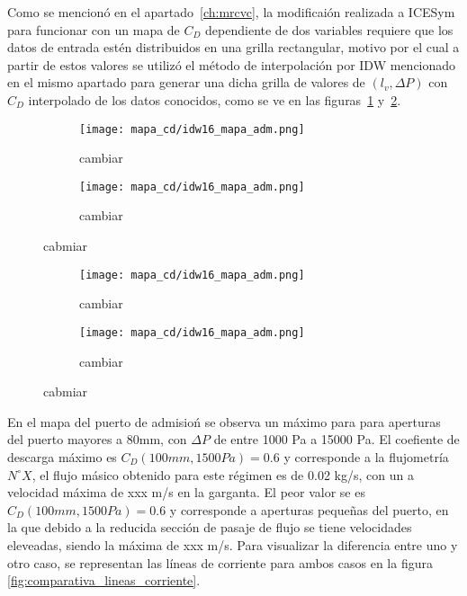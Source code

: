 Como se mencionó en el apartado~\ref{ch:mrcvc}, la modificaión realizada a
ICESym para funcionar con un mapa de $C_{D}$ dependiente de dos variables
requiere que los datos de entrada estén distribuidos en una grilla rectangular,
motivo por el cual a partir de estos valores se utilizó el método de
interpolación por IDW mencionado en el mismo apartado para generar una dicha
grilla de valores de $(l_{v}, \Delta P)$ con $C_{D}$ interpolado de los datos
conocidos, como se ve en las figuras~\ref{fig:mapa_cd_admision}
y~\ref{fig:mapa_cd_escape}.

\begin{figure}
    \centering
    \begin{subfigure}{0.4\textwidth}
        \centering
        \texttt{[image: mapa\_cd/idw16\_mapa\_adm.png]}
        \caption{cambiar}
    \end{subfigure}
    \hfill
    \begin{subfigure}{0.4\textwidth}
        \centering
        \texttt{[image: mapa\_cd/idw16\_mapa\_adm.png]}
        \caption{cambiar}
    \end{subfigure}
    \caption{cabmiar}\label{fig:mapa_cd_admision}
\end{figure}

\begin{figure}
    \centering
    \begin{subfigure}{0.4\textwidth}
        \centering
        \texttt{[image: mapa\_cd/idw16\_mapa\_adm.png]}
        \caption{cambiar}
    \end{subfigure}
    \hfill
    \begin{subfigure}{0.4\textwidth}
        \centering
        \texttt{[image: mapa\_cd/idw16\_mapa\_adm.png]}
        \caption{cambiar}
    \end{subfigure}
    \caption{cabmiar}\label{fig:mapa_cd_escape}
\end{figure}

En el mapa del puerto de admisioń se observa un máximo para para aperturas del
puerto mayores a 80mm, con $\Delta P$ de entre 1000 Pa a 15000 Pa.
%
El coefiente de descarga máximo es $C_{D}(100mm, 1500Pa) = 0.6$ y corresponde a
la flujometría $N^{\circ} X$, el flujo másico obtenido para este régimen es de
0.02 kg/s, con un a velocidad máxima de xxx m/s en la garganta.
%
El peor valor se es $C_{D}(100mm, 1500Pa) = 0.6$ y corresponde a aperturas
pequeñas del puerto, en la que debido a la reducida sección de pasaje de flujo
se tiene velocidades eleveadas, siendo la máxima de xxx m/s.
%
Para visualizar la diferencia entre uno y otro caso, se representan las líneas
de corriente para ambos casos en la figura \ref{fig:comparativa_lineas_corriente}.

